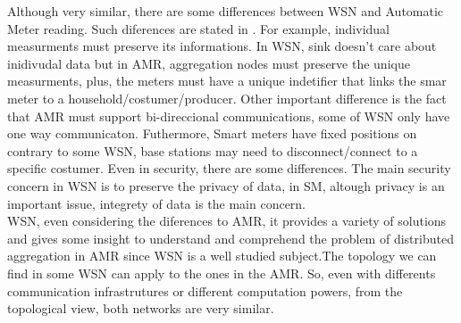 Although very similar, there are some differences between WSN and Automatic Meter reading. Such diferences are stated in \cite{khalifa2011survey}. For example, individual measurments must preserve its informations. In WSN, sink doesn't care about inidivudal data but in AMR, aggregation nodes must preserve the unique measurments, plus, the meters must have a unique indetifier that links the smar meter to a household/costumer/producer. Other  important difference is the fact that AMR must support bi-direccional communications, some of WSN only have one way communicaton. Futhermore, Smart meters have fixed positions on contrary to some WSN, base stations may need to disconnect/connect to a specific costumer. Even in security, there are some differences. The main security concern in WSN is to preserve the privacy of data, in SM, altough privacy is an important issue, integrety of data is the main concern.\\
WSN, even considering the diferences to AMR, it provides a variety of solutions and gives some insight to understand and comprehend the problem of distributed aggregation in AMR since WSN is a well studied subject.The topology we can find in some WSN can apply to the ones in the AMR. So, even with differents communication infrastrutures or different computation powers,  from the topological view, both networks are very similar.\\

